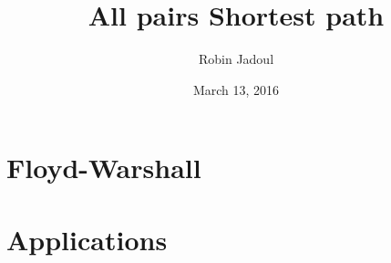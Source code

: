 \documentclass{beamer}
\title{All pairs Shortest path}
\author{Robin Jadoul}
\date{March 13, 2016}
\institute
{
    \texttt{[image: ../shared-img/beoi-logo.png]}
}
\begin{document}
\frame{\titlepage}

\section[Floyd-Warshall]{Floyd-Warshall}


\section[Applications]{Applications}

\end{document}
